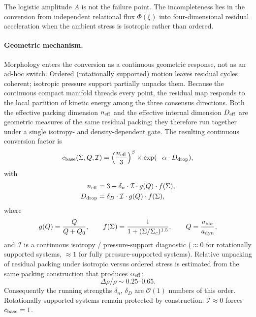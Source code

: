 \documentclass[11pt,a4paper]{article}
\begin{document}
The logistic amplitude \(A\) is not the failure point. The incompleteness lies in the conversion from independent relational flux \(\Phi(\xi)\) into four-dimensional residual acceleration when the ambient stress is isotropic rather than ordered.

\paragraph{Geometric mechanism.}
Morphology enters the conversion as a continuous geometric response, not as an ad-hoc switch. Ordered (rotationally supported) motion leaves residual cycles coherent; isotropic pressure support partially unpacks them. Because the continuous compact manifold threads every point, the residual map responds to the local partition of kinetic energy among the three consensus directions. Both the effective packing dimension \(n_{\rm eff}\) and the effective internal dimension \(D_{\rm eff}\) are geometric measures of the same residual packing; they therefore run together under a single isotropy- and density-dependent gate. The resulting continuous conversion factor is
\begin{equation}
c_{\rm base}(\Sigma,Q,\mathcal{I})
=
\Bigl(\frac{n_{\rm eff}}{3}\Bigr)^{\beta}
\times
\exp(-\alpha\cdot D_{\rm drop}),
\label{eq:c-base}
\end{equation}
with
\begin{align}
n_{\rm eff}&=3-\delta_n\cdot\mathcal{I}\cdot g(Q)\cdot f(\Sigma),
\label{eq:n-eff}\\
D_{\rm drop}&=\delta_D\cdot\mathcal{I}\cdot g(Q)\cdot f(\Sigma),
\label{eq:D-drop}
\end{align}
where
\[
g(Q)=\frac{Q}{Q+Q_0},\qquad
f(\Sigma)=\frac{1}{1+(\Sigma/\Sigma_c)^{1.5}},
\qquad
Q=\frac{a_{\rm bar}}{a_{\rm dyn}},
\]
and \(\mathcal{I}\) is a continuous isotropy / pressure-support diagnostic (\(\approx0\) for rotationally supported systems, \(\approx1\) for fully pressure-supported systems). Relative unpacking of residual packing under isotropic versus ordered stress is estimated from the same packing construction that produces \(\alpha_{\rm eff}\):
\[
\Delta\rho/\rho\sim0.25\text{--}0.65.
\]
Consequently the running strengths \(\delta_n\), \(\delta_D\) are \(\mathcal{O}(1)\) numbers of this order. Rotationally supported systems remain protected by construction: \(\mathcal{I}\approx0\) forces \(c_{\rm base}=1\).
\end{document}
